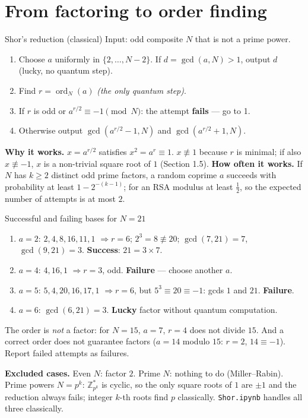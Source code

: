 \documentclass[11pt,a4paper,openany]{book}
\newcounter{wex}[chapter]
\newenvironment{steps}{\begin{enumerate}[label=\textbf{Step \arabic*.}, leftmargin=4.2em, itemsep=2pt]}{\end{enumerate}}
\begin{document}
\section{From factoring to order finding}
\begin{method}{Shor's reduction (classical)}
Input: odd composite $N$ that is not a prime power.
\begin{enumerate}[itemsep=1pt]
\item Choose $a$ uniformly in $\{2, \dots, N - 2\}$. If $d = \gcd(a, N) > 1$, output $d$ (lucky, no quantum step).
\item Find $r = \operatorname{ord}_N(a)$ \hfill\emph{(the only quantum step)}.
\item If $r$ is odd or $a^{r/2} \equiv -1 \pmod N$: the attempt \textbf{fails} --- go to 1.
\item Otherwise output $\gcd(a^{r/2} - 1, N)$ and $\gcd(a^{r/2} + 1, N)$.
\end{enumerate}
\end{method}
\textbf{Why it works.} $x = a^{r/2}$ satisfies $x^2 = a^r \equiv 1$. $x \not\equiv 1$ because $r$ is minimal; if also $x \not\equiv -1$, $x$ is a non-trivial square root
of $1$ (Section 1.5). \textbf{How often it works.} If $N$ has $k \ge 2$ distinct odd prime factors, a random coprime $a$ succeeds with probability at least
$1 - 2^{-(k-1)}$; for an RSA modulus at least $\frac12$, so the expected number of attempts is at most $2$.

\begin{wexample}{Successful and failing bases for $N = 21$}
\begin{steps}
\item $a = 2$: $2, 4, 8, 16, 11, 1$ $\Rightarrow r = 6$; $2^3 = 8 \not\equiv 20$; $\gcd(7, 21) = 7$, $\gcd(9, 21) = 3$. \textbf{Success}: $21 = 3\times7$.
\item $a = 4$: $4, 16, 1$ $\Rightarrow r = 3$, odd. \textbf{Failure} --- choose another $a$.
\item $a = 5$: $5, 4, 20, 16, 17, 1$ $\Rightarrow r = 6$, but $5^3 \equiv 20 \equiv -1$: gcds $1$ and $21$. \textbf{Failure}.
\item $a = 6$: $\gcd(6, 21) = 3$. \textbf{Lucky} factor without quantum computation.
\end{steps}
\end{wexample}

\begin{trap}
The order is \emph{not} a factor: for $N = 15$, $a = 7$, $r = 4$ does not divide $15$. And a correct order does not guarantee factors ($a = 14$ modulo $15$:
$r = 2$, $14 \equiv -1$). Report failed attempts as failures.
\end{trap}
\textbf{Excluded cases.} Even $N$: factor $2$. Prime $N$: nothing to do (Miller--Rabin). Prime powers $N = p^k$: $\mathbb Z_{p^k}^*$ is cyclic, so the
only square roots of $1$ are $\pm1$ and the reduction always fails; integer $k$-th roots find $p$ classically. \texttt{Shor.ipynb} handles all three classically.
\end{document}
